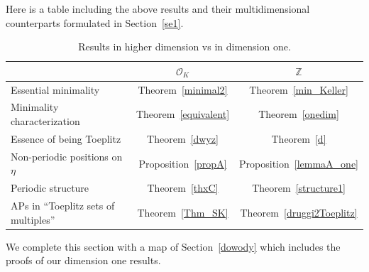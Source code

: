 \documentclass[leqno,a4paper,12pt]{article}
\newtheorem{Th}{Theorem}[section]
\theoremstyle{definition}
\newcommand{\Z}{{\mathbb{Z}}}
\newcommand{\OK}{\mathcal{O}_K}
\newcommand{\sB}{\mathscr{B}}
\begin{document}
Here is a table including the above results and their multidimensional counterparts formulated in Section~\ref{se1}.
\begin{table}[ht]
\centering
\begin{tabular}[t]{lcc}
\hline
&$\OK$&$\Z$\\
\hline
Essential minimality&Theorem~\ref{minimal2}&Theorem~\ref{min_Keller}\\
Minimality characterization&Theorem~\ref{equivalent}&Theorem~\ref{onedim}\\
Essence of being Toeplitz & Theorem~\ref{dwyz} & Theorem~\ref{d} \\
Non-periodic positions on $\eta$&Proposition~\ref{propA}&Proposition~\ref{lemmaA_one}\\
Periodic structure&Theorem~\ref{thxC}&Theorem~\ref{structure1}\\
APs in ``Toeplitz sets of multiples''&Theorem~\ref{Thm_SK}&Theorem~\ref{druggi2Toeplitz}\\
\hline
\end{tabular}
\caption{Results in higher dimension vs in dimension one.}
\end{table}%

We complete this section with a map of Section~\ref{dowody} which includes the proofs of our dimension one results.
\end{document}
